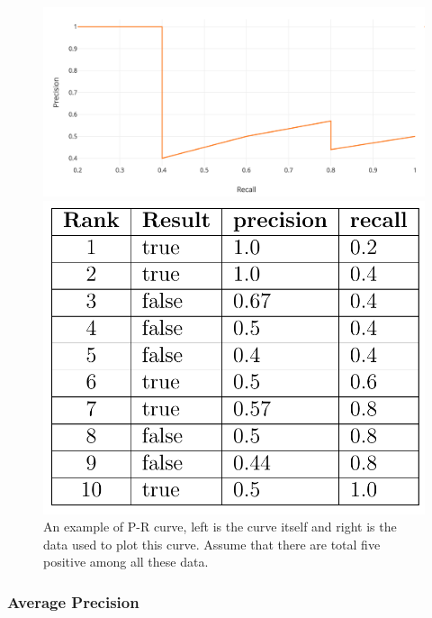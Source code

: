 \begin{figure}
    \centering
    \begin{minipage}[b]{0.65\textwidth}
        \centering
        \includegraphics[width=\linewidth]{figures/eval_pr_curve.png}
    \end{minipage}%
    \begin{minipage}[b]{0.35\textwidth}
        \centering
        \includegraphics[width=\linewidth]{figures/eval_pr_curve_data.png}
    \end{minipage}
    \caption[An example of Precision-Recall curve]
    {An example of P-R curve, left is the curve itself and right is the data
        used to plot this curve. Assume that there are total five positive
        among
        all these data.}
    \label{fig:eval-pr-curve}
\end{figure}

\subsubsection{Average Precision}
\label{sec:Eval-ap}


